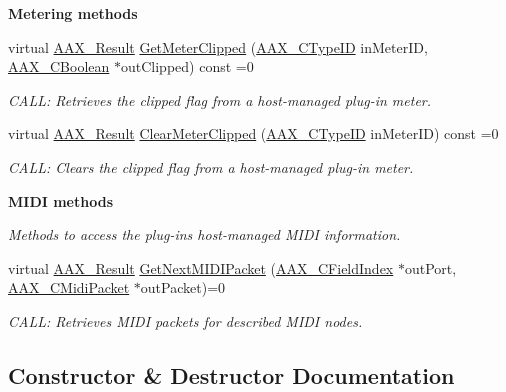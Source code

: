 \begin{Indent}{\bf Metering methods}
\begin{DoxyCompactItemize}
virtual \hyperlink{a00149_a4d8f69a697df7f70c3a8e9b8ee130d2f}{A\+A\+X\+\_\+\+Result} \hyperlink{a00090_a1f07fa44cd8b3c4fddee9c0b78d35bbd}{Get\+Meter\+Clipped} (\hyperlink{a00149_ac678f9c1fbcc26315d209f71a147a175}{A\+A\+X\+\_\+\+C\+Type\+I\+D} in\+Meter\+I\+D, \hyperlink{a00149_aa216506530f1d19a2965931ced2b274b}{A\+A\+X\+\_\+\+C\+Boolean} $\ast$out\+Clipped) const =0
\begin{DoxyCompactList}\small\item\em C\+A\+L\+L\+: Retrieves the clipped flag from a host-\/managed plug-\/in meter. \end{DoxyCompactList}\item 
virtual \hyperlink{a00149_a4d8f69a697df7f70c3a8e9b8ee130d2f}{A\+A\+X\+\_\+\+Result} \hyperlink{a00090_a2c989b51cd74e0ce0319baf6d1c82465}{Clear\+Meter\+Clipped} (\hyperlink{a00149_ac678f9c1fbcc26315d209f71a147a175}{A\+A\+X\+\_\+\+C\+Type\+I\+D} in\+Meter\+I\+D) const =0
\begin{DoxyCompactList}\small\item\em C\+A\+L\+L\+: Clears the clipped flag from a host-\/managed plug-\/in meter. \end{DoxyCompactList}\end{DoxyCompactItemize}
\end{Indent}
\begin{Indent}{\bf M\+I\+D\+I methods}\par
{\em Methods to access the plug-\/in\textquotesingle{}s host-\/managed M\+I\+D\+I information. }\begin{DoxyCompactItemize}
\item 
virtual \hyperlink{a00149_a4d8f69a697df7f70c3a8e9b8ee130d2f}{A\+A\+X\+\_\+\+Result} \hyperlink{a00090_a2896ba3a1ed86ce2813b1736d316d275}{Get\+Next\+M\+I\+D\+I\+Packet} (\hyperlink{a00149_ae807f8986143820cfb5d6da32165c9c7}{A\+A\+X\+\_\+\+C\+Field\+Index} $\ast$out\+Port, \hyperlink{a00024}{A\+A\+X\+\_\+\+C\+Midi\+Packet} $\ast$out\+Packet)=0
\begin{DoxyCompactList}\small\item\em C\+A\+L\+L\+: Retrieves M\+I\+D\+I packets for described M\+I\+D\+I nodes. \end{DoxyCompactList}\end{DoxyCompactItemize}
\end{Indent}


\subsection{Constructor \& Destructor Documentation}
\hypertarget{a00090_aa8dee55f260a0f92f29b95f9d7acc9dd}{}
